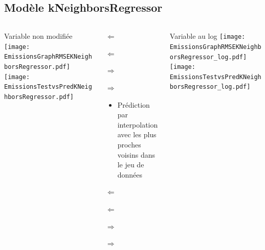 \documentclass[8pt,aspectratio=169,hyperref={unicode=true}]{beamer}
\begin{document}
\subsection{Modèle kNeighborsRegressor}
\begin{frame}{\insertsubsection}
  \begin{columns}[t]
    \begin{column}{.33\textwidth}
      \centering Variable non modifiée
      \texttt{[image: EmissionsGraphRMSEKNeighborsRegressor.pdf]}
      \texttt{[image: EmissionsTestvsPredKNeighborsRegressor.pdf]}
    \end{column}
    \begin{column}{.33\textwidth}
      $\Longleftarrow$

      {\footnotesize
          }

      \raggedright
      $\Longleftarrow$

      \raggedleft
      $\Longrightarrow$

      {\footnotesize
          }

      \raggedleft
      $\Longrightarrow$

      \raggedright
      \begin{itemize}
        \item Prédiction par interpolation avec les plus proches voisins dans le jeu de données
      \end{itemize}

      $\Longleftarrow$
      {\scriptsize \centering
          }

      $\Longleftarrow$

      \raggedleft
      $\Longrightarrow$

      {\scriptsize \centering
          
        }
      \raggedleft
      $\Longrightarrow$
    \end{column}
    \begin{column}{.33\textwidth}
      \centering Variable au log
      \texttt{[image: EmissionsGraphRMSEKNeighborsRegressor\_log.pdf]}
      \texttt{[image: EmissionsTestvsPredKNeighborsRegressor\_log.pdf]}
    \end{column}
  \end{columns}
\end{frame}
\end{document}
